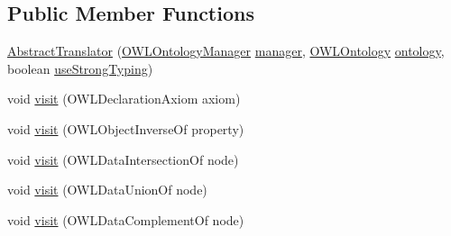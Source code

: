 \subsection*{Public Member Functions}
\begin{DoxyCompactItemize}
\item 
\hyperlink{classorg_1_1coode_1_1owlapi_1_1rdf_1_1model_1_1_abstract_translator_3_01_n_o_d_e_00_01_r_e_s_o_ubc597564c2cb8c8d2b0139cb32f3f91c_a45f1617b83350e7540789ea0245af51f}{Abstract\-Translator} (\hyperlink{interfaceorg_1_1semanticweb_1_1owlapi_1_1model_1_1_o_w_l_ontology_manager}{O\-W\-L\-Ontology\-Manager} \hyperlink{classorg_1_1coode_1_1owlapi_1_1rdf_1_1model_1_1_abstract_translator_3_01_n_o_d_e_00_01_r_e_s_o_ubc597564c2cb8c8d2b0139cb32f3f91c_a5306dc2c025827213358f576372942b7}{manager}, \hyperlink{interfaceorg_1_1semanticweb_1_1owlapi_1_1model_1_1_o_w_l_ontology}{O\-W\-L\-Ontology} \hyperlink{classorg_1_1coode_1_1owlapi_1_1rdf_1_1model_1_1_abstract_translator_3_01_n_o_d_e_00_01_r_e_s_o_ubc597564c2cb8c8d2b0139cb32f3f91c_a813886458674d164d20624b00c00164c}{ontology}, boolean \hyperlink{classorg_1_1coode_1_1owlapi_1_1rdf_1_1model_1_1_abstract_translator_3_01_n_o_d_e_00_01_r_e_s_o_ubc597564c2cb8c8d2b0139cb32f3f91c_a90d3e5e751bc5528d563c49f1c88ca5f}{use\-Strong\-Typing})
\item 
void \hyperlink{classorg_1_1coode_1_1owlapi_1_1rdf_1_1model_1_1_abstract_translator_3_01_n_o_d_e_00_01_r_e_s_o_ubc597564c2cb8c8d2b0139cb32f3f91c_aaeee2010fbc274b5b4f428fb351b8773}{visit} (O\-W\-L\-Declaration\-Axiom axiom)
\item 
void \hyperlink{classorg_1_1coode_1_1owlapi_1_1rdf_1_1model_1_1_abstract_translator_3_01_n_o_d_e_00_01_r_e_s_o_ubc597564c2cb8c8d2b0139cb32f3f91c_a826b880d904918b43e5f400586401583}{visit} (O\-W\-L\-Object\-Inverse\-Of property)
\item 
void \hyperlink{classorg_1_1coode_1_1owlapi_1_1rdf_1_1model_1_1_abstract_translator_3_01_n_o_d_e_00_01_r_e_s_o_ubc597564c2cb8c8d2b0139cb32f3f91c_af331f1304c99fced6b34a187e74e027d}{visit} (O\-W\-L\-Data\-Intersection\-Of node)
\item 
void \hyperlink{classorg_1_1coode_1_1owlapi_1_1rdf_1_1model_1_1_abstract_translator_3_01_n_o_d_e_00_01_r_e_s_o_ubc597564c2cb8c8d2b0139cb32f3f91c_a926e416c4ab2013f07eeac9688c8f172}{visit} (O\-W\-L\-Data\-Union\-Of node)
\item 
void \hyperlink{classorg_1_1coode_1_1owlapi_1_1rdf_1_1model_1_1_abstract_translator_3_01_n_o_d_e_00_01_r_e_s_o_ubc597564c2cb8c8d2b0139cb32f3f91c_aab420dbe660b9a72240030baa5762d82}{visit} (O\-W\-L\-Data\-Complement\-Of node)

\end{DoxyCompactItemize}
